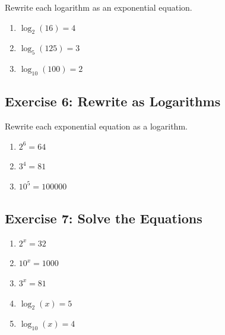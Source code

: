 \documentclass[a4paper, 11pt]{article}
\begin{document}
Rewrite each logarithm as an exponential equation.

\begin{enumerate}
    \item $\log_2(16)=4$
    \vspace{1cm}

    \item $\log_5(125)=3$
    \vspace{1cm}

    \item $\log_{10}(100)=2$
    \vspace{1cm}
\end{enumerate}

\subsection*{Exercise 6: Rewrite as Logarithms}

Rewrite each exponential equation as a logarithm.

\begin{enumerate}
    \item $2^6=64$
    \vspace{1cm}

    \item $3^4=81$
    \vspace{1cm}

    \item $10^5=100000$
    \vspace{1cm}
\end{enumerate}

\subsection*{Exercise 7: Solve the Equations}

\begin{enumerate}
    \item $2^x=32$

    \vspace{1cm}

    \item $10^x=1000$

    \vspace{1cm}

    \item $3^x=81$

    \vspace{1cm}

    \item $\log_2(x)=5$

    \vspace{1cm}

    \item $\log_{10}(x)=4$

    \vspace{1cm}
\end{enumerate}
\end{document}
